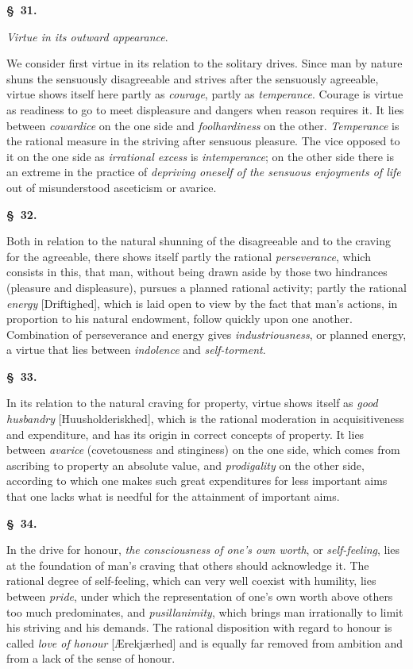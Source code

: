 \documentclass[12pt]{article}
\newcommand{\opage}[1]{\marginnote{\footnotesize\textit{[#1]}}}
\newcommand{\slaw}[1]{\par\medskip\begin{center}\textbf{\S~#1.}\end{center}\nopagebreak}
\newcommand{\anm}[1]{\par\smallskip{\small\hangindent=1.6em\hangafter=0\textit{Note.}\quad #1\par}\smallskip}
\begin{document}
\anm{On \emph{moral weakness and badness}.}

\slaw{31}
\begin{center}\emph{Virtue in its outward appearance}.\end{center}
\opage{156}We consider first virtue in its relation to the solitary drives. Since man by nature shuns the sensuously disagreeable and strives after the sensuously agreeable, virtue shows itself here partly as \emph{courage}, partly as \emph{temperance}. Courage is virtue as readiness to go to meet displeasure and dangers when reason requires it. It lies between \emph{cowardice} on the one side and \emph{foolhardiness} on the other. \emph{Temperance} is the rational measure in the striving after sensuous pleasure. The vice opposed to it on the one side as \emph{irrational excess} is \emph{intemperance}; on the other side there is an extreme in the practice of \emph{depriving oneself of the sensuous enjoyments of life} out of misunderstood asceticism or avarice.

\slaw{32}
Both in relation to the natural shunning of the disagreeable and to the craving for the agreeable, there shows itself partly the rational \emph{perseverance}, which consists in this, that man, without being drawn aside by those two hindrances (pleasure and displeasure), pursues a planned rational activity; partly the rational \emph{energy} [Driftighed], which is laid open to view by the fact that man's actions, in proportion to his natural endowment, follow quickly upon one another. Combination of perseverance and energy gives \emph{industriousness}, or planned energy, a virtue that lies between \emph{indolence} and \emph{self-torment}.

\slaw{33}
In its relation to the natural craving for property, virtue shows itself as \emph{good husbandry} [Huusholderiskhed], which is the rational moderation in acquisitiveness and expenditure, and has its origin in correct concepts of property. It lies between \emph{avarice} (covetousness and stinginess) on the one side, which comes from ascribing to property an absolute value, and \emph{prodigality} on the other \opage{157}side, according to which one makes such great expenditures for less important aims that one lacks what is needful for the attainment of important aims.

\slaw{34}
In the drive for honour, \emph{the consciousness of one's own worth}, or \emph{self-feeling}, lies at the foundation of man's craving that others should acknowledge it. The rational degree of self-feeling, which can very well coexist with humility, lies between \emph{pride}, under which the representation of one's own worth above others too much predominates, and \emph{pusillanimity}, which brings man irrationally to limit his striving and his demands. The rational disposition with regard to honour is called \emph{love of honour} [Ærekjærhed] and is equally far removed from ambition and from a lack of the sense of honour.
\end{document}
